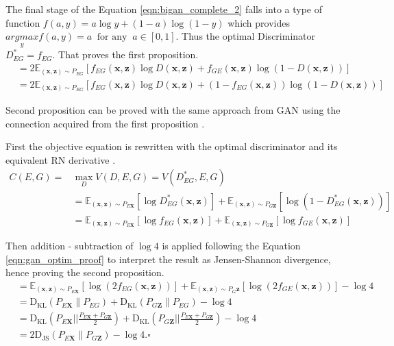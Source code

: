 {The final stage of the Equation \ref{eqn:bigan_complete_2} falls into a type of function $ f(a,y) = a\log y + (1 -a) \log(1-y)$
\cite{Donahue2017AdversarialFL} which provides $\underset{y}{argmax} f(a,y) = a\ \text{ for any }\ a
\in [0,1]$. Thus the optimal Discriminator $D^*_{EG} = f_{EG}$. That proves the first proposition. 
\begin{align}
    &=2 \mathbb{E}_{(\mathbf{x}, \mathbf{z}) \sim P_{E G}}\left[f_{E G}(\mathbf{x}, \mathbf{z}) \log D(\mathbf{x}, \mathbf{z})+f_{G E}(\mathbf{x}, \mathbf{z}) \log (1-D(\mathbf{x}, \mathbf{z}))\right] \\[5pt]
    \label{eqn:bigan_complete_2}
    &=2 \mathbb{E}_{(\mathbf{x}, \mathbf{z}) \sim P_{E G}}\left[f_{E G}(\mathbf{x}, \mathbf{z}) \log D(\mathbf{x}, \mathbf{z})+\left(1-f_{E G}(\mathbf{x}, \mathbf{z})\right) \log (1-D(\mathbf{x}, \mathbf{z}))\right]
\end{align}

Second proposition can be proved with the same approach from
GAN \cite{Goodfellow:2014:GAN:2969033.2969125} using the connection acquired from the first
proposition \cite{Donahue2017AdversarialFL}.

First the objective equation is rewritten with the optimal discriminator and its equivalent RN
derivative \cite{Donahue2017AdversarialFL}.
\begin{align}
    C(E, G)=&\max _{D} V(D, E, G)=V\left(D_{E G}^{*}, E, G\right) \\[5pt]
    & =\mathbb{E}_{(\mathbf{x}, \mathbf{z}) \sim P_{E \mathbf{X}}}\left[\log D_{E G}^{*}(\mathbf{x}, \mathbf{z})\right]+\mathbb{E}_{(\mathbf{x}, \mathbf{z}) \sim P_{G \mathbf{Z}}}\left[\log \left(1-D_{E G}^{*}(\mathbf{x}, \mathbf{z})\right)\right] \\[5pt]
    & =\mathbb{E}_{(\mathbf{x}, \mathbf{z}) \sim P_{E \mathbf{X}}}\left[\log f_{E G}(\mathbf{x}, \mathbf{z})\right]+\mathbb{E}_{(\mathbf{x}, \mathbf{z}) \sim P_{G \mathbf{Z}}}\left[\log f_{G E}(\mathbf{x}, \mathbf{z})\right]
\end{align}

Then addition - subtraction of $\log4$ is applied following the Equation \ref{eqn:gan_optim_proof}
to interpret the result as Jensen-Shannon divergence, hence proving the second proposition.
\begin{align}
    &=\mathbb{E}_{(\mathbf{x}, \mathbf{z}) \sim P_{E \mathbf{X}}}\left[\log \left(2 f_{E G}(\mathbf{x}, \mathbf{z})\right)\right]+\mathbb{E}_{(\mathbf{x}, \mathbf{z}) \sim P_{G} \mathbf{z}}\left[\log \left(2 f_{G E}(\mathbf{x}, \mathbf{z})\right)\right]-\log 4 \\[5pt]
    & =\mathrm{D}_{\mathrm{KL}}\left(P_{E \mathbf{X}} \| P_{E G}\right)+\mathrm{D}_{\mathrm{KL}}\left(P_{G \mathbf{Z}} \| P_{E G}\right)-\log 4 \\[5pt]
    &=\mathrm{D}_{\mathrm{KL}}\left(P_{E \mathbf{X}}| | \frac{P_{E \mathbf{X}}+P_{G \mathbf{Z}}}{2}\right)+\mathrm{D}_{\mathrm{KL}}\left(P_{G \mathbf{Z}}| | \frac{P_{E \mathbf{X}}+P_{G \mathbf{Z}}}{2}\right)-\log 4 \\[5pt]
    & =2 \mathrm{D}_{\mathrm{JS}}\left(P_{E \mathbf{X}} \| P_{G \mathbf{Z}}\right)-\log 4 . \square
\end{align}

}
